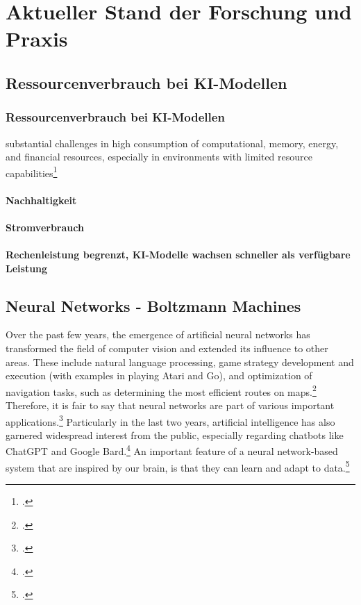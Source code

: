 \chapter{Aktueller Stand der Forschung und Praxis}

\section{Ressourcenverbrauch bei KI-Modellen}
\subsection{Ressourcenverbrauch bei KI-Modellen}

substantial challenges in high consumption of computational, memory, energy, and financial resources, especially in environments with limited resource capabilities\footcite[cf.][1-2]{baiEfficiencySystematicSurvey2024}

\subsubsection{Nachhaltigkeit}
\subsubsection{Stromverbrauch}
\subsubsection{Rechenleistung begrenzt, KI-Modelle wachsen schneller als verfügbare Leistung}

\section{Neural Networks - Boltzmann Machines}

Over the past few years, the emergence of artificial neural networks has transformed
the field of computer vision and extended its influence to other areas. These include natural language processing,
game strategy development and execution (with examples in playing Atari and Go),
and optimization of navigation tasks, such as determining the most efficient routes on maps.\footcite[cf.][305]{cichyDeepNeuralNetworks2019}
Therefore, it is fair to say that neural networks are part of various important applications.\footcite[cf.][1513]{gawlikowskiSurveyUncertaintyDeep2023}
Particularly in the last two years, artificial intelligence has also garnered widespread interest from the public, especially regarding chatbots like ChatGPT and Google Bard.\footcite[cf.][1-2]{singhChatGPTGoogle2023}  
An important feature of a neural network-based system that are inspired by our brain, is that they can learn and adapt to data.\footcite[cf.][305]{cichyDeepNeuralNetworks2019}

